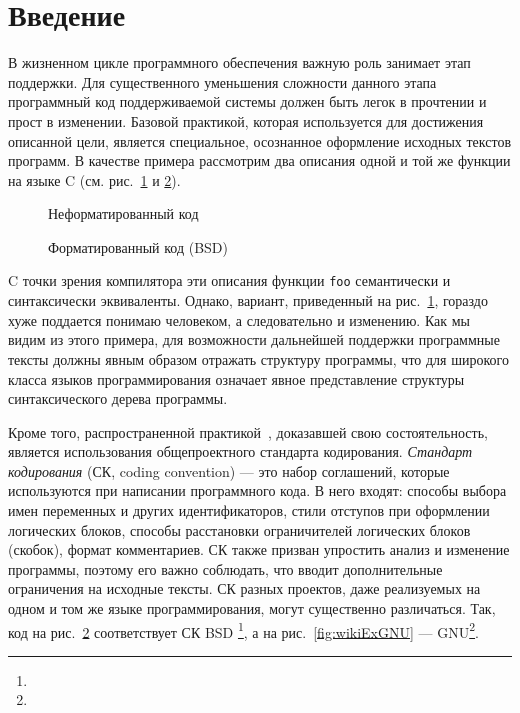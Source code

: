\section*{Введение}

В жизненном цикле программного обеспечения важную роль занимает этап
поддержки\cite{maintance}. Для существенного уменьшения сложности данного этапа
программный код поддерживаемой системы должен быть легок в прочтении и прост
в изменении. Базовой практикой, которая используется для достижения описанной
цели, является специальное, осознанное оформление исходных текстов программ.
В качестве примера рассмотрим два описания одной и той же функции на языке C
(см. рис.~\ref{fig:wikiExUnfor} и \ref{fig:wikiExBSD}).

\begin{figure}[h!]
	\centering
	
	\caption{Неформатированный код}
	\label{fig:wikiExUnfor}
\end{figure}

\begin{figure}[h!]
	\centering
	
  \caption{Форматированный код (BSD)}
	\label{fig:wikiExBSD}
\end{figure}

C точки зрения компилятора
эти описания функции \lstinline[language = Java]{foo}
семантически и синтаксически эквиваленты.
Однако, вариант, приведенный на
рис.~\ref{fig:wikiExUnfor}, гораздо хуже
поддается понимаю человеком, а следовательно и изменению.
Как мы видим из этого примера, для возможности дальнейшей поддержки
программные тексты должны явным образом
отражать структуру программы, что для широкого класса языков
программирования означает явное представление структуры синтаксического
дерева программы.

Кроме того, распространенной практикой~\cite{codingStandarts},
доказавшей свою состоятельность, является использования
общепроектного стандарта кодирования.
\emph{Стандарт кодирования} (СК, coding convention) ---
это набор соглашений, которые используются
при написании программного кода. В него входят: способы выбора имен переменных
и других идентификаторов, стили отступов при оформлении логических блоков,
способы расстановки ограничителей логических блоков (скобок),
формат комментариев. СК также призван упростить анализ и изменение
программы, поэтому его важно соблюдать, что вводит
дополнительные ограничения на исходные тексты. СК разных проектов, даже
реализуемых на одном и том же языке программирования, могут существенно
различаться.
Так, код на рис.~\ref{fig:wikiExBSD} соответствует СК
BSD \footnote{},
а на рис.~\ref{fig:wikiExGNU} ---
GNU\footnote{}.

